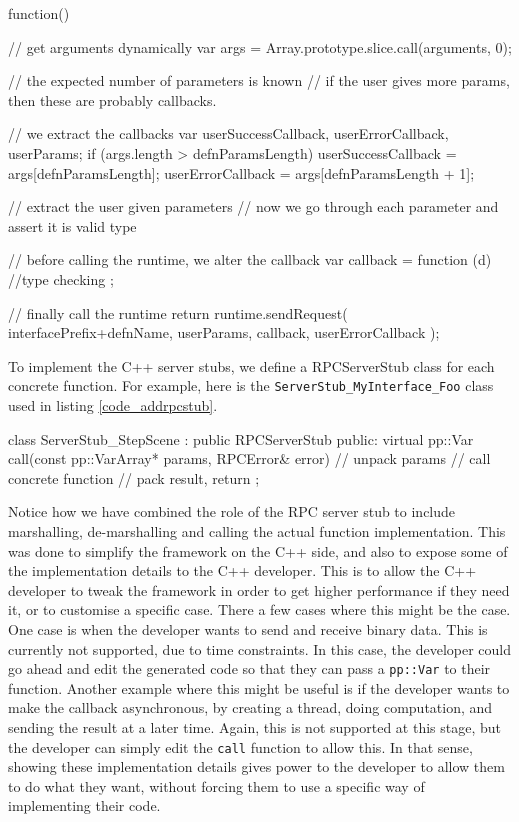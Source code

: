 \begin{code}
function(){
  // get arguments dynamically
  var args = Array.prototype.slice.call(arguments, 0);

  // the expected number of parameters is known
  // if the user gives more params, then these are probably callbacks.

  // we extract the callbacks
  var userSuccessCallback, userErrorCallback, userParams;
  if (args.length > defnParamsLength) {
    userSuccessCallback = args[defnParamsLength];
    userErrorCallback = args[defnParamsLength + 1];
  }

  // extract the user given parameters
  // now we go through each parameter and assert it is valid type

  // before calling the runtime, we alter the callback
  var callback = function (d) {
    //type checking
  };


  // finally call the runtime
  return runtime.sendRequest(
    interfacePrefix+defnName, 
    userParams, 
    callback, 
    userErrorCallback
  );
}
\end{code}

To implement the C++ server stubs, we define a RPCServerStub class for each concrete function. For example, here is the \lstinline{ServerStub_MyInterface_Foo} class used in listing \ref{code_addrpcstub}.

\begin{code}
class ServerStub_StepScene : public RPCServerStub{
public:
	virtual pp::Var call(const pp::VarArray* params, RPCError& error){
		// unpack params
		// call concrete function
		// pack result, return
	}
};
\end{code}

Notice how we have combined the role of the RPC server stub to include marshalling, de-marshalling and calling the actual function implementation. This was done to simplify the framework on the C++ side, and also to expose some of the implementation details to the C++ developer. This is to allow the C++ developer to tweak the framework in order to get higher performance if they need it, or to customise a specific case. There a few cases where this might be the case. One case is when the developer wants to send and receive binary data. This is currently not supported, due to time constraints. In this case, the developer could go ahead and edit the generated code so that they can pass a \lstinline{pp::Var} to their function. Another example where this might be useful is if the developer wants to make the callback asynchronous, by creating a thread, doing computation, and sending the result at a later time. Again, this is not supported at this stage, but the developer can simply edit the \lstinline{call} function to allow this. In that sense, showing these implementation details gives power to the developer to allow them to do what they want, without forcing them to use a specific way of implementing their code.

